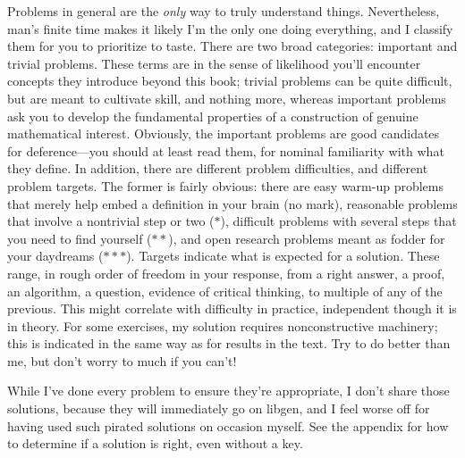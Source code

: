 Problems in general are the \textit{only} way to truly understand things.
Nevertheless, man's finite time makes it likely I'm the only one doing everything, and I classify them for you to prioritize to taste.
There are two broad categories: important and trivial problems.
These terms are in the sense of likelihood you'll encounter concepts they introduce beyond this book; trivial problems can be quite difficult,
but are meant to cultivate skill, and nothing more, whereas important problems ask you to develop the fundamental properties
of a construction of genuine mathematical interest.
Obviously, the important problems are good candidates for deference---you should at least read them, for nominal familiarity with what they define.
In addition, there are different problem difficulties, and different problem targets.
The former is fairly obvious: there are easy warm-up problems that merely help embed a definition in your brain (no mark),
reasonable problems that involve a nontrivial step or two ($*$), difficult problems with several steps that you need to find yourself ($**$),
and open research problems meant as fodder for your daydreams ($***$).
Targets indicate what is expected for a solution.
These range, in rough order of freedom in your response, from a right answer, a proof, an algorithm, a question,
evidence of critical thinking, to multiple of any of the previous.
This might correlate with difficulty in practice, independent though it is in theory.
For some exercises, my solution requires nonconstructive machinery; this is indicated in the same way as for results in the text.
Try to do better than me, but don't worry to much if you can't!

While I've done every problem to ensure they're appropriate, I don't share those solutions, because they will immediately go on libgen,
and I feel worse off for having used such pirated solutions on occasion myself.
See the appendix for how to determine if a solution is right, even without a key.
